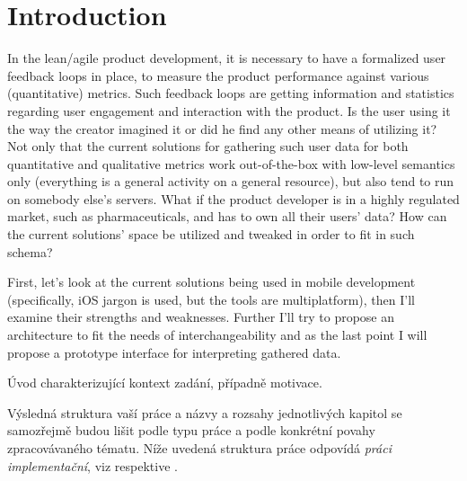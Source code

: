 \chapter{Introduction}

In the lean/agile product development, it is necessary to have a formalized user feedback loops in place, to measure the product performance against various (quantitative) metrics. Such feedback loops are getting information and statistics regarding user engagement and interaction with the product. Is the user using it the way the creator imagined it or did he find any other means of utilizing it? Not only that the current solutions for gathering such user data for both quantitative and qualitative metrics work out-of-the-box with low-level semantics only (everything is a general activity on a general resource), but also tend to run on somebody else's servers. What if the product developer is in a highly regulated market, such as pharmaceuticals, and has to own all their users' data? How can the current solutions' space be utilized and tweaked in order to fit in such schema?

First, let's look at the current solutions being used in mobile development (specifically, iOS jargon is used, but the tools are multiplatform), then I'll examine their strengths and weaknesses. Further I'll try to propose an architecture to fit the needs of interchangeability and as the last point I will propose a prototype interface for interpreting gathered data.



Úvod charakterizující kontext zadání, případně motivace.

Výsledná struktura vaší práce a názvy a rozsahy jednotlivých kapitol se samozřejmě budou lišit podle typu práce a podle konkrétní povahy zpracovávaného tématu. Níže uvedená struktura práce odpovídá \textit{práci implementační}, viz \cite{infodp} respektive \cite{infobp}.